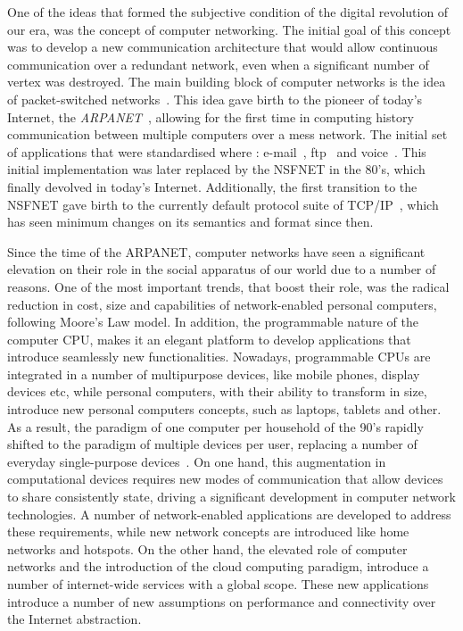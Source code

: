 One of the ideas that formed the subjective condition of the digital revolution
of our era, was the concept of computer networking. The initial goal of this
concept was to develop a new communication architecture that would allow
continuous communication over a redundant network, even when a significant
number of vertex was destroyed.  The main building block of computer networks is
the idea of packet-switched networks~\cite{Licklider1963}.  This idea gave birth
to the pioneer of today's Internet, the {\it ARPANET}~\cite{Mills:1987tt},
allowing for the first time in computing history communication between multiple
computers over a mess network. The initial set of applications
that were standardised where : e-mail~\cite{RFC0561},
ftp~\cite{RFC0354} and voice~\cite{RFC0741}. This initial implementation was
later replaced by the NSFNET in the 80's, which finally devolved in today's
Internet. Additionally, the first transition to the NSFNET gave birth to the 
currently default protocol suite of TCP/IP~\cite{Clark:1988}, which has
seen minimum changes on its semantics and format since then.

Since the time of the ARPANET, computer networks have seen a significant
elevation on their role in the social apparatus of our world due to a number of
reasons. One of the most important trends, that boost their role, was the radical
reduction in cost, size and capabilities of network-enabled personal
computers, following Moore's Law model. In addition, the programmable nature of
the computer CPU, makes it an elegant platform to develop applications that
introduce seamlessly new functionalities. Nowadays, programmable CPUs are
integrated in a number of multipurpose devices, like mobile phones, display
devices etc, while personal computers, with their ability to transform in size,
introduce new personal computers concepts, such as laptops, tablets and other.
As a result, the paradigm of one computer per household of the 90's rapidly
shifted to the paradigm of multiple devices per user, replacing
a number of everyday single-purpose devices~\cite{Dholakia:2006vn}.  On one hand, this
augmentation in computational devices requires new modes of communication that
allow devices to share consistently state, driving a significant development in
computer network technologies. A number of network-enabled applications are
developed to address these requirements, while new network concepts are
introduced like home networks and hotspots. On the other hand, the elevated role
of computer networks and the introduction of the cloud computing paradigm,
introduce a number of internet-wide services with a global scope. These new
applications introduce a number of new assumptions on performance and connectivity
over the Internet abstraction. 

